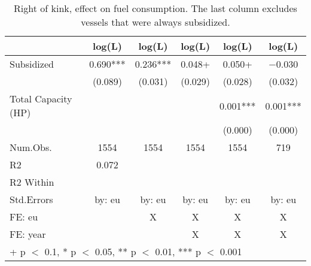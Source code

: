 \begin{table}

\caption{\label{tab:}Right of kink, effect on fuel consumption. The last column excludes vessels that were always subsidized.}
\centering
\begin{tabular}[t]{lccccc}
\toprule
  & log(L) & log(L)  & log(L)   & log(L)    & log(L)    \\
\midrule
Subsidized & \num{0.690}*** & \num{0.236}*** & \num{0.048}+ & \num{0.050}+ & \num{-0.030}\\
 & (\num{0.089}) & (\num{0.031}) & (\num{0.029}) & (\num{0.028}) & (\num{0.032})\\
Total Capacity (HP) &  &  &  & \num{0.001}*** & \num{0.001}***\\
 &  &  &  & (\num{0.000}) & (\num{0.000})\\
\midrule
Num.Obs. & \num{1554} & \num{1554} & \num{1554} & \num{1554} & \num{719}\\
R2 & \num{0.072} &  &  &  & \\
R2 Within &  &  &  &  & \\
Std.Errors & by: eu & by: eu & by: eu & by: eu & by: eu\\
FE: eu &  & X & X & X & X\\
FE: year &  &  & X & X & X\\
\bottomrule
\multicolumn{6}{l}{\rule{0pt}{1em}+ p $<$ 0.1, * p $<$ 0.05, ** p $<$ 0.01, *** p $<$ 0.001}\\
\end{tabular}
\end{table}
